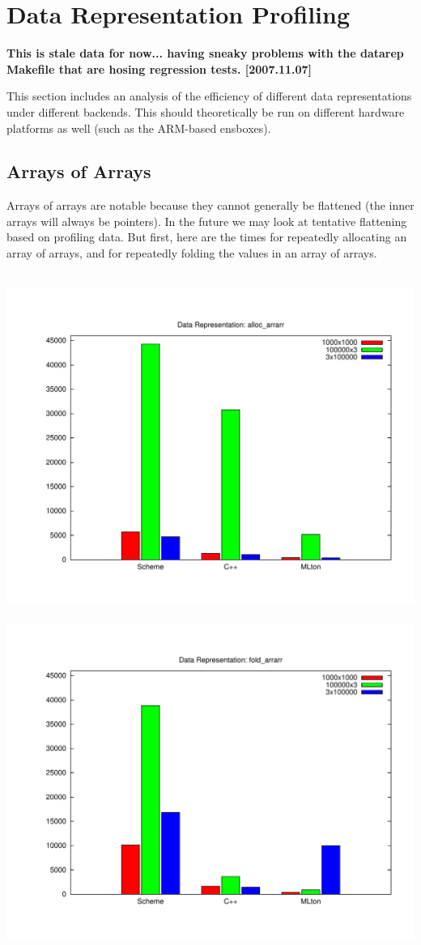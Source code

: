 \documentclass{article}
\begin{document}
\section{Data Representation Profiling}

{\bf This is stale data for now... having sneaky problems with the
datarep Makefile that are hosing regression tests. [2007.11.07]}

This section includes an analysis of the efficiency of different data
representations under different backends.  This should theoretically
be run on different hardware platforms as well (such as the ARM-based ensboxes).

\subsection{Arrays of Arrays}

Arrays of arrays are notable because they cannot generally be
flattened (the inner arrays will always be pointers).  In the future
we may look at tentative flattening based on profiling data.  But
first, here are the times for repeatedly allocating an array of
arrays, and for repeatedly folding the values in an array of arrays.

\begin{center}
\mbox{
\includegraphics[width=0.48\hsize]{datareps/alloc_arrarr.pdf}
\includegraphics[width=0.48\hsize]{datareps/fold_arrarr.pdf}
}
\end{center}
\end{document}
